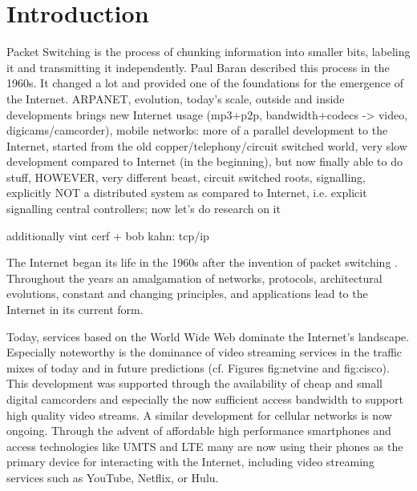 \chapter{Introduction}
\label{chap:intro}

Packet Switching is the process of chunking information into smaller bits, labeling it and transmitting it independently. Paul Baran described this process in the 1960s\cite{baran1964distributed}. It changed a lot and provided one of the foundations for the emergence of the Internet. ARPANET, evolution, today's scale, outside and inside developments brings new Internet usage (mp3+p2p, bandwidth+codecs -> video, digicams/camcorder), mobile networks: more of a parallel development to the Internet, started from the old copper/telephony/circuit switched world, very slow development compared to Internet (in the beginning), but now finally able to do stuff, HOWEVER, very different beast, circuit switched roots, signalling, explicitly NOT a distributed system as compared to Internet, i.e. explicit signalling central controllers; now let's do research on it

additionally vint cerf + bob kahn: tcp/ip \cite{1092259}


The Internet began its life in the 1960s after the invention of packet switching \cite{baran1964distributed}. Throughout the years an amalgamation of networks, protocols, architectural evolutions, constant and changing principles, and applications lead to the Internet in its current form.

Today, services based on the World Wide Web dominate the Internet's landscape. Especially noteworthy is the dominance of video streaming services in the traffic mixes of today and in future predictions (cf. Figures fig:netvine and fig:cisco). This development was supported through the availability of cheap and small digital camcorders and especially the now sufficient access bandwidth to support high quality video streams.
A similar development for cellular networks is now ongoing. Through the advent of affordable high performance smartphones and access technologies like UMTS and LTE many are now using their phones as the primary device for interacting with the Internet, including video streaming services such as YouTube, Netflix, or Hulu.

